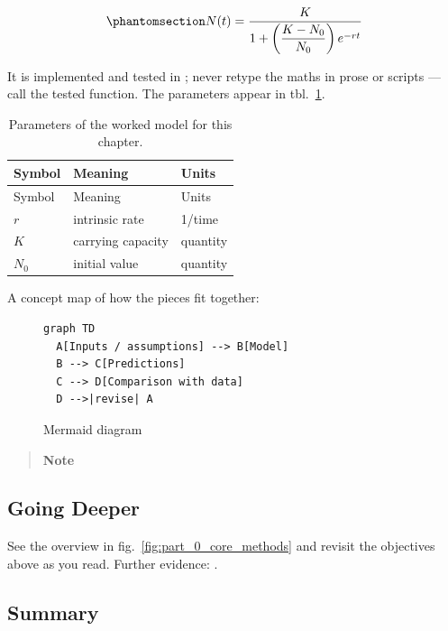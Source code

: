 \documentclass[
]{article}
\theoremstyle{plain}
\theoremstyle{definition}
\begin{document}
\begin{equation}\protect\phantomsection\label{eq:part_0_core_methods_model}{ N(t) = \frac{K}{1 + \left(\dfrac{K - N_0}{N_0}\right) e^{-rt}} }\end{equation}

It is implemented and tested in
; never retype the maths in
prose or scripts --- call the tested function. The parameters appear in
tbl.~\ref{tbl:part_0_core_methods_parameters}.

\begin{longtable}[]{@{}lll@{}}
\caption{Parameters of the worked model for this
chapter.}\label{tbl:part_0_core_methods_parameters}\tabularnewline
\toprule\noalign{}
Symbol & Meaning & Units \\
\midrule\noalign{}
\endfirsthead
\toprule\noalign{}
Symbol & Meaning & Units \\
\midrule\noalign{}
\endhead
\bottomrule\noalign{}
\endlastfoot
\(r\) & intrinsic rate & 1/time \\
\(K\) & carrying capacity & quantity \\
\(N_0\) & initial value & quantity \\
\end{longtable}

A concept map of how the pieces fit together:

\begin{figure}[htbp]
\centering
\begin{verbatim}
graph TD
  A[Inputs / assumptions] --> B[Model]
  B --> C[Predictions]
  C --> D[Comparison with data]
  D -->|revise| A
\end{verbatim}
\caption{Mermaid diagram}
\end{figure}

\begin{quote}
\textbf{Note}
\end{quote}

\subsection{Going Deeper}\label{going-deeper-1}

See the overview in fig.~\ref{fig:part_0_core_methods} and revisit the
objectives above as you read. Further evidence:
\citep{kim2020data, brown2017principles}.

\subsection{Summary}\label{summary-1}
\end{document}
